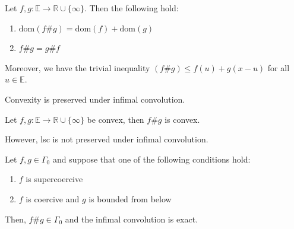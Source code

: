 \documentclass{tufte-handout}
\begin{document}
\begin{Lemma}
    \label{lem:inf_conv}
    Let \(f,g: \mathbb{E}\to \mathbb{R}\cup \{\infty\}\). Then the following hold:
    \begin{enumerate}
        \item \( \text{dom}(f \# g) = \text{dom}(f) + \text{dom}(g) \)
        \item \( f \# g = g \# f \)
    \end{enumerate}
\end{Lemma}
Moreover, we have the trivial 
inequality \( (f \# g) \leq f(u) + g(x-u) \) for all \( u \in \mathbb{E} \).

Convexity is preserved under infimal convolution.
\begin{Proposition}
    \label{prop:inf_conv_cvx}
    Let \( f, g: \mathbb{E}\to \mathbb{R}\cup \{\infty\} \) be convex, then \( f\# g \) is convex.
\end{Proposition}
However, lsc is not preserved under infimal convolution.



\begin{Theorem}
    Let \( f, g \in \Gamma_0 \) and suppose that one of the following conditions hold:
    \begin{enumerate}
        \item \( f \) is supercoercive
        \item \( f \) is coercive and \( g \) is bounded from below
    \end{enumerate}
    Then, \( f \# g \in \Gamma_0 \) and the infimal convolution is exact.
\end{Theorem}
\end{document}
